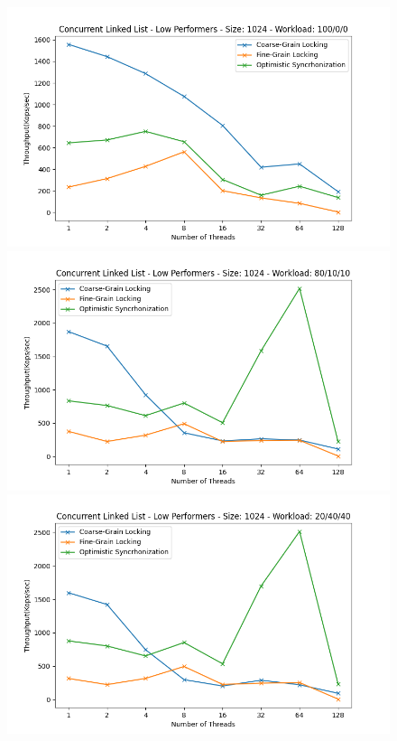 \documentclass[../final_report.tex]{subfiles}
\begin{document}
\begin{figure}[H]
    \centering
        \includegraphics[scale=0.4]{outFiles/plots/concurrent_data_structs_low_1024_100_0_0.png}
        \includegraphics[scale=0.4]{outFiles/plots/concurrent_data_structs_low_1024_80_10_10.png}
        \includegraphics[scale=0.4]{outFiles/plots/concurrent_data_structs_low_1024_20_40_40.png}

\end{figure}
\end{document}
